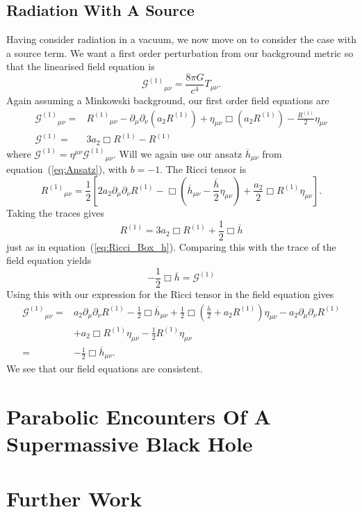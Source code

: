 \documentclass[a4paper, 11pt, titlepage, twoside]{report}
\newcommand{\eqnref}[1]{equation~(\ref{eq:#1})}
\newcommand{\recip}[1]{\ensuremath{\frac{1}{#1}}}
\begin{document}
\section{Radiation With A Source}

Having consider radiation in a vacuum, we now move on to consider the case with a source term. We want a first order perturbation from our background metric so that the linearised field equation is
\begin{equation}
{\mathcal{G}^{(1)}}_{\mu\nu} = \frac{8\pi G}{c^4}T_{\mu\nu}.
\end{equation}
Again assuming a Minkowski background, our first order field equations are
\begin{align}
{\mathcal{G}^{(1)}}_{\mu\nu} = {} & {R^{(1)}}_{\mu\nu} - \partial_\mu\partial_\nu(a_2 R^{(1)}) + \eta_{\mu\nu}\Box(a_2 R^{(1)}) - \frac{R^{(1)}}{2}\eta_{\mu\nu} \\
\mathcal{G}^{(1)} = {} & 3a_2 \Box R^{(1)} - R^{(1)}
\end{align}
where $\mathcal{G}^{(1)} = \eta^{\mu\nu}{\mathcal{G}^{(1)}}_{\mu\nu}$. Will we again use our ansatz $\overline{h}_{\mu\nu}$ from \eqnref{Ansatz}, with $b = -1$. The Ricci tensor is
\begin{equation}
{R^{(1)}}_{\mu\nu} = \frac{1}{2}\left[2 a_2 \partial_\mu\partial_\nu R^{(1)} - \Box\left(\overline{h}_{\mu\nu} -\frac{\overline{h}}{2}\eta_{\mu\nu}\right) + \frac{a_2}{2}\Box R^{(1)}\eta_{\mu\nu}\right].
\end{equation}
Taking the traces gives
\begin{equation}
R^{(1)} = 3a_2\Box R^{(1)} + \recip{2}\Box\overline{h} 
\end{equation}
just as in \eqnref{Ricci_Box_h}. Comparing this with the trace of the field equation yields
\begin{equation}
-\recip{2}\Box\overline{h} = \mathcal{G}^{(1)}
\end{equation}
Using this with our expression for the Ricci tensor in the field equation gives
\begin{align}
{\mathcal{G}^{(1)}}_{\mu\nu} = {} & a_2\partial_\mu\partial_\nu R^{(1)} - \recip{2}\Box\overline{h}_{\mu\nu} + \recip{2}\Box\left(\frac{\overline{h}}{2} + a_2 R^{(1)}\right)\eta_{\mu\nu} - a_2\partial_\mu\partial_\nu R^{(1)}  \nonumber \\
 & + {} a_2\Box R^{(1)} \eta_{\mu\nu} - \recip{2}R^{(1)}\eta_{\mu\nu} \nonumber \\
 = {} & - \recip{2}\Box\overline{h}_{\mu\nu}.
\end{align}
We see that our field equations are consistent.

\chapter{Parabolic Encounters Of A Supermassive Black Hole}

\chapter{Further Work}

\newpage


\end{document}
